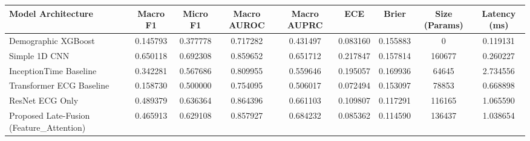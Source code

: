 \begin{tabular}{lcccccccc}
\toprule
Model Architecture & Macro F1 & Micro F1 & Macro AUROC & Macro AUPRC & ECE & Brier & Size (Params) & Latency (ms) \\
\midrule
Demographic XGBoost & 0.145793 & 0.377778 & 0.717282 & 0.431497 & 0.083160 & 0.155883 & 0 & 0.119131 \\
Simple 1D CNN & 0.650118 & 0.692308 & 0.859652 & 0.651712 & 0.217847 & 0.157814 & 160677 & 0.260227 \\
InceptionTime Baseline & 0.342281 & 0.567686 & 0.809955 & 0.559646 & 0.195057 & 0.169936 & 64645 & 2.734556 \\
Transformer ECG Baseline & 0.158730 & 0.500000 & 0.754095 & 0.506017 & 0.072494 & 0.153097 & 78853 & 0.668898 \\
ResNet ECG Only & 0.489379 & 0.636364 & 0.864396 & 0.661103 & 0.109807 & 0.117291 & 116165 & 1.065590 \\
Proposed Late-Fusion (Feature_Attention) & 0.465913 & 0.629108 & 0.857927 & 0.684232 & 0.085362 & 0.114590 & 136437 & 1.038654 \\
\bottomrule
\end{tabular}
